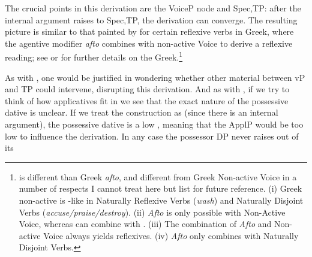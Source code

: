 \begin{exe}
\begin{xlist}
\begin{xlist}
\begin{exe}
\begin{xlist}
\begin{xlist}
\begin{exe}
\begin{xlist}
\begin{xlist}
\begin{exe}
\begin{exe}
\begin{xlist}
\begin{exe}
\begin{exe}
\begin{xlist}
\begin{exe}
\begin{exe}
\begin{exe}
\begin{exe}
\begin{exe}
\begin{xlist}
\begin{exe}
\begin{xlist}
\begin{exe}
\begin{exe}
\begin{xlist}
\begin{exe}
\begin{xlist}
\begin{exe}
\begin{xlist}
\begin{exe}
\begin{exe}
\begin{exe}
\begin{xlist}
\begin{exe}
\begin{exe}
\begin{exe}
\begin{xlist}
\begin{exe}
\begin{xlist}
\begin{exe}
\begin{xlist}
\begin{exe}
\begin{xlist}
\begin{exe}
\begin{exe}
\begin{exe}
\begin{exe}
\begin{xlist}
\begin{exe}
\begin{xlist}
\begin{exe}
\begin{xlist}
\begin{exe}
\begin{xlist}
\begin{exe}
\begin{xlist}
\begin{exe}
\begin{xlist}
\begin{exe}
\begin{exe}
\begin{exe}
\begin{exe}
\begin{xlist}
\begin{exe}
\begin{xlist}
\begin{exe}
\begin{xlist}
\begin{exe}
\begin{exe}
\begin{xlist}
\begin{exe}
\begin{xlist}
\begin{exe}
\begin{exe}
\begin{exe}
\begin{exe}
\begin{xlist}
\begin{xlist}
\begin{exe}
\begin{xlist}
\begin{exe}
\begin{exe}
\begin{exe}
\begin{xlist}
\begin{exe}
\begin{exe}
\begin{xlist}
\begin{exe}
\begin{exe}
\begin{exe}
\begin{xlist}
\begin{xlist}
\begin{exe}
\begin{xlist}
\begin{exe}
\begin{exe}
\begin{exe}
\begin{exe}
\begin{xlist}
\begin{exe}
\begin{xlist}
\begin{exe}
\begin{xlist}
\begin{exe}
\begin{xlist}
\begin{exe}
\begin{exe}
\begin{exe}
\begin{exe}


\vspace{2em}

The crucial points in this derivation are the VoiceP node and Spec,TP: after the internal argument raises to Spec,TP, the derivation can converge. The resulting picture is similar to that painted by \cite{spathasetal15} for certain reflexive verbs in Greek, where the agentive modifier \emph{afto} combines with non-active Voice to derive a reflexive reading; see \cite{spathasetal15} or \cite{kastner17gjgl} for further details on the Greek.\footnote{{\va} is different than Greek \emph{afto}, and {\vz} different from Greek Non-active Voice in a number of respects I cannot treat here but list for future reference. (i) Greek non-active is -like in Naturally Reflexive Verbs (\emph{wash}) and Naturally Disjoint Verbs (\emph{accuse/praise/destroy}). (ii) \emph{Afto} is only possible with Non-Active Voice, whereas {\va} can combine with . (iii) The combination of \emph{Afto} and Non-active Voice always yields reflexives. (iv) \emph{Afto} only combines with Naturally Disjoint Verbs.}

As with , one would be justified in wondering whether other material between vP and TP could intervene, disrupting this derivation. And as with , if we try to think of how applicatives fit in we see that the exact nature of the possessive dative is unclear. If we treat the construction as  (since there is an internal argument), the possessive dative is a low , meaning that the ApplP would be too low to influence the derivation. In any case the possessor DP never raises out of its 
\end{exe}
\end{exe}
\end{exe}
\end{exe}
\end{xlist}
\end{exe}
\end{xlist}
\end{exe}
\end{xlist}
\end{exe}
\end{xlist}
\end{exe}
\end{exe}
\end{exe}
\end{exe}
\end{xlist}
\end{exe}
\end{xlist}
\end{xlist}
\end{exe}
\end{exe}
\end{exe}
\end{xlist}
\end{exe}
\end{exe}
\end{xlist}
\end{exe}
\end{exe}
\end{exe}
\end{xlist}
\end{exe}
\end{xlist}
\end{xlist}
\end{exe}
\end{exe}
\end{exe}
\end{exe}
\end{xlist}
\end{exe}
\end{xlist}
\end{exe}
\end{exe}
\end{xlist}
\end{exe}
\end{xlist}
\end{exe}
\end{xlist}
\end{exe}
\end{exe}
\end{exe}
\end{exe}
\end{xlist}
\end{exe}
\end{xlist}
\end{exe}
\end{xlist}
\end{exe}
\end{xlist}
\end{exe}
\end{xlist}
\end{exe}
\end{xlist}
\end{exe}
\end{exe}
\end{exe}
\end{exe}
\end{xlist}
\end{exe}
\end{xlist}
\end{exe}
\end{xlist}
\end{exe}
\end{xlist}
\end{exe}
\end{exe}
\end{exe}
\end{xlist}
\end{exe}
\end{exe}
\end{exe}
\end{xlist}
\end{exe}
\end{xlist}
\end{exe}
\end{xlist}
\end{exe}
\end{exe}
\end{xlist}
\end{exe}
\end{xlist}
\end{exe}
\end{exe}
\end{exe}
\end{exe}
\end{exe}
\end{xlist}
\end{exe}
\end{exe}
\end{xlist}
\end{exe}
\end{exe}
\end{xlist}
\end{xlist}
\end{exe}
\end{xlist}
\end{xlist}
\end{exe}
\end{xlist}
\end{xlist}
\end{exe}
